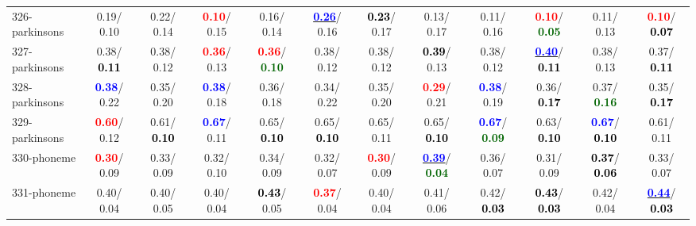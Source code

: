 \begin{table}[h]
\begin{center}
{\begin{tabular}{lc|c|c|c|c|c|c|c|c|c|c}
326-parkinsons &   0.19/  0.10 &   0.22/  0.14 & \textcolor{red}{\textbf{  0.10}}/  0.15 &   0.16/  0.14 & \underline{\textcolor{blue}{\textbf{  0.26}}}/  0.16 & \textcolor{black}{\textbf{  0.23}}/  0.17 &   0.13/  0.17 &   0.11/  0.16 & \textcolor{red}{\textbf{  0.10}}/\textcolor{darkgreen}{\textbf{  0.05}} &   0.11/  0.13 & \textcolor{red}{\textbf{  0.10}}/\textcolor{black}{\textbf{  0.07}} \\
327-parkinsons &   0.38/\textcolor{black}{\textbf{  0.11}} &   0.38/  0.12 & \textcolor{red}{\textbf{  0.36}}/  0.13 & \textcolor{red}{\textbf{  0.36}}/\textcolor{darkgreen}{\textbf{  0.10}} &   0.38/  0.12 &   0.38/  0.12 & \textcolor{black}{\textbf{  0.39}}/  0.13 &   0.38/  0.12 & \underline{\textcolor{blue}{\textbf{  0.40}}}/\textcolor{black}{\textbf{  0.11}} &   0.38/  0.13 &   0.37/\textcolor{black}{\textbf{  0.11}} \\ \hline
328-parkinsons & \textcolor{blue}{\textbf{  0.38}}/  0.22 &   0.35/  0.20 & \textcolor{blue}{\textbf{  0.38}}/  0.18 &   0.36/  0.18 &   0.34/  0.22 &   0.35/  0.20 & \textcolor{red}{\textbf{  0.29}}/  0.21 & \textcolor{blue}{\textbf{  0.38}}/  0.19 &   0.36/\textcolor{black}{\textbf{  0.17}} &   0.37/\textcolor{darkgreen}{\textbf{  0.16}} &   0.35/\textcolor{black}{\textbf{  0.17}} \\
329-parkinsons & \textcolor{red}{\textbf{  0.60}}/  0.12 &   0.61/\textcolor{black}{\textbf{  0.10}} & \textcolor{blue}{\textbf{  0.67}}/  0.11 &   0.65/\textcolor{black}{\textbf{  0.10}} &   0.65/\textcolor{black}{\textbf{  0.10}} &   0.65/  0.11 &   0.65/\textcolor{black}{\textbf{  0.10}} & \textcolor{blue}{\textbf{  0.67}}/\textcolor{darkgreen}{\textbf{  0.09}} &   0.63/\textcolor{black}{\textbf{  0.10}} & \textcolor{blue}{\textbf{  0.67}}/\textcolor{black}{\textbf{  0.10}} &   0.61/  0.11 \\
330-phoneme & \textcolor{red}{\textbf{  0.30}}/  0.09 &   0.33/  0.09 &   0.32/  0.10 &   0.34/  0.09 &   0.32/  0.07 & \textcolor{red}{\textbf{  0.30}}/  0.09 & \underline{\textcolor{blue}{\textbf{  0.39}}}/\textcolor{darkgreen}{\textbf{  0.04}} &   0.36/  0.07 &   0.31/  0.09 & \textcolor{black}{\textbf{  0.37}}/\textcolor{black}{\textbf{  0.06}} &   0.33/  0.07 \\
331-phoneme &   0.40/  0.04 &   0.40/  0.05 &   0.40/  0.04 & \textcolor{black}{\textbf{  0.43}}/  0.05 & \textcolor{red}{\textbf{  0.37}}/  0.04 &   0.40/  0.04 &   0.41/  0.06 &   0.42/\textcolor{black}{\textbf{  0.03}} & \textcolor{black}{\textbf{  0.43}}/\textcolor{black}{\textbf{  0.03}} &   0.42/  0.04 & \underline{\textcolor{blue}{\textbf{  0.44}}}/\textcolor{black}{\textbf{  0.03}} \\

\end{tabular}}
\end{center}
\end{table}
